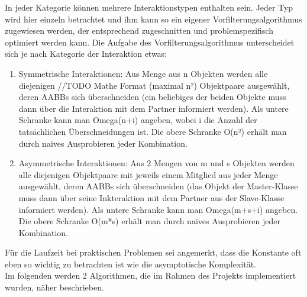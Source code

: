 In jeder Kategorie können mehrere Interaktionstypen enthalten sein. Jeder Typ wird hier einzeln betrachtet und ihm kann so ein eigener Vorfilterungsalgorithmus zugewiesen werden, der entsprechend zugeschnitten und problemspezifisch optimiert werden kann.
Die Aufgabe des Vorfilterungsalgorithmus unterscheidet sich je nach Kategorie der Interaktion etwas:
\begin{enumerate}
\item Symmetrische Interaktionen: Aus Menge aus n Objekten werden alle diejenigen //TODO Mathe Format (maximal n²) Objektpaare ausgewählt, deren AABBs sich überschneiden (ein beliebiges der beiden Objekte muss dann über die Interaktion mit dem Partner informiert werden). Als untere Schranke kann man Omega(n+i) angeben, wobei i die Anzahl der tatsächlichen Überschneidungen ist. Die obere Schranke O(n²) erhält man durch naives Ausprobieren jeder Kombination.
\item Asymmetrische Interaktionen: Aus 2 Mengen von m und s Objekten werden alle diejenigen Objektpaare mit jeweils einem Mitglied aus jeder Menge ausgewählt, deren AABBs sich überschneiden (das Objekt der Master-Klasse muss dann über seine Inkteraktion mit dem Partner aus der Slave-Klasse informiert werden). Als untere Schranke kann man Omega(m+s+i) angeben. Die obere Schranke O(m*s) erhält man durch naives Ausprobieren jeder Kombination.
\end{enumerate}

Für die Laufzeit bei praktischen Problemen sei angemerkt, dass die Konstante oft eben so wichtig zu betrachten ist wie die asymptotische Komplexität. \\

Im folgenden werden 2 Algorithmen, die im Rahmen des Projekts implementiert wurden, näher beschrieben.

